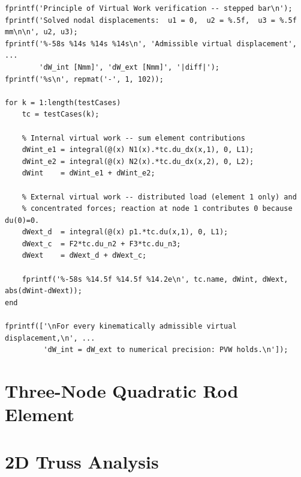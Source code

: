 \begin{lstlisting}[caption={PVW verification for the stepped bar (Chapter~\ref{ch:1d})},
                   label={code:pvw_verification}]
%% Verify PVW for each case
fprintf('Principle of Virtual Work verification -- stepped bar\n');
fprintf('Solved nodal displacements:  u1 = 0,  u2 = %.5f,  u3 = %.5f mm\n\n', u2, u3);
fprintf('%-58s %14s %14s %14s\n', 'Admissible virtual displacement', ...
        'dW_int [Nmm]', 'dW_ext [Nmm]', '|diff|');
fprintf('%s\n', repmat('-', 1, 102));

for k = 1:length(testCases)
    tc = testCases(k);

    % Internal virtual work -- sum element contributions
    dWint_e1 = integral(@(x) N1(x).*tc.du_dx(x,1), 0, L1);
    dWint_e2 = integral(@(x) N2(x).*tc.du_dx(x,2), 0, L2);
    dWint    = dWint_e1 + dWint_e2;

    % External virtual work -- distributed load (element 1 only) and
    % concentrated forces; reaction at node 1 contributes 0 because du(0)=0.
    dWext_d  = integral(@(x) p1.*tc.du(x,1), 0, L1);
    dWext_c  = F2*tc.du_n2 + F3*tc.du_n3;
    dWext    = dWext_d + dWext_c;

    fprintf('%-58s %14.5f %14.5f %14.2e\n', tc.name, dWint, dWext, abs(dWint-dWext));
end

fprintf(['\nFor every kinematically admissible virtual displacement,\n', ...
         'dW_int = dW_ext to numerical precision: PVW holds.\n']);

\end{lstlisting}

\section{Three-Node Quadratic Rod Element}
\label{lst:bar3node}



\section{2D Truss Analysis}
\label{lst:truss2d}

